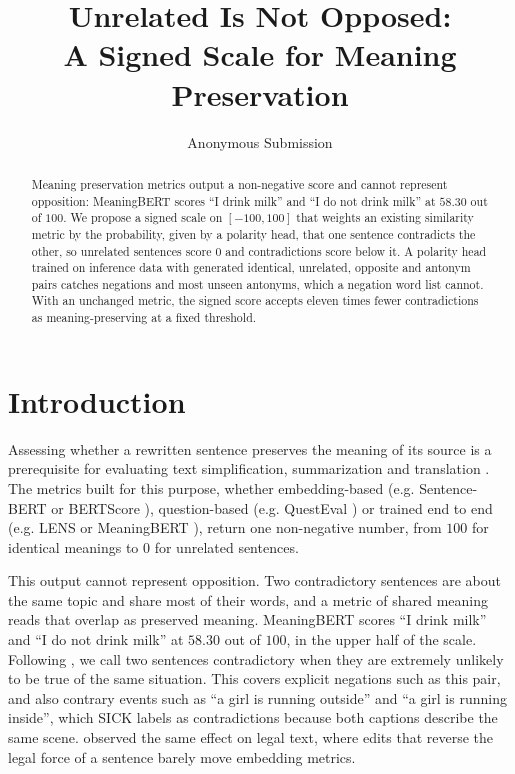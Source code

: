 \documentclass[11pt]{article}
\title{Unrelated Is Not Opposed:\\A Signed Scale for Meaning Preservation}
\author{Anonymous Submission}
\date{}
\begin{document}
\maketitle

\begin{abstract}
Meaning preservation metrics output a non-negative score and cannot represent opposition: MeaningBERT scores ``I drink milk'' and ``I do not drink milk'' at $58.30$ out of $100$.
We propose a signed scale on $[-100, 100]$ that weights an existing similarity metric by the probability, given by a polarity head, that one sentence contradicts the other, so unrelated sentences score $0$ and contradictions score below it.
A polarity head trained on inference data with generated identical, unrelated, opposite and antonym pairs catches negations and most unseen antonyms, which a negation word list cannot.
With an unchanged metric, the signed score accepts eleven times fewer contradictions as meaning-preserving at a fixed threshold.
\end{abstract}

\section{Introduction}
\label{sec:intro}

Assessing whether a rewritten sentence preserves the meaning of its source is a prerequisite for evaluating text simplification, summarization and translation \citep{saggion2017automatic}.
The metrics built for this purpose, whether embedding-based (e.g. Sentence-BERT \citep{reimers2019sbert} or BERTScore \citep{zhang2020bertscore}), question-based (e.g. QuestEval \citep{scialom2021questeval}) or trained end to end (e.g. LENS \citep{maddela2023lens} or MeaningBERT \citep{beauchemin2023meaningbert}), return one non-negative number, from $100$ for identical meanings to $0$ for unrelated sentences.

This output cannot represent opposition.
Two contradictory sentences are about the same topic and share most of their words, and a metric of shared meaning reads that overlap as preserved meaning.
MeaningBERT scores ``I drink milk'' and ``I do not drink milk'' at $58.30$ out of $100$, in the upper half of the scale.
Following \citet{demarneffe2008contradictions}, we call two sentences contradictory when they are extremely unlikely to be true of the same situation.
This covers explicit negations such as this pair, and also contrary events such as ``a girl is running outside'' and ``a girl is running inside'', which SICK labels as contradictions because both captions describe the same scene.
\citet{baral2026lexflip} observed the same effect on legal text, where edits that reverse the legal force of a sentence barely move embedding metrics.
\end{document}
